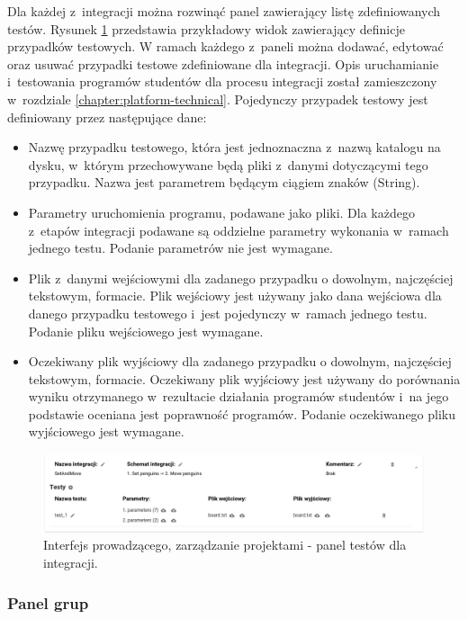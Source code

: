 Dla każdej z~integracji można rozwinąć panel zawierający listę zdefiniowanych testów.
Rysunek \ref{fig:lecturer_integrations_tests} przedstawia przykładowy widok zawierający definicje przypadków testowych.
W ramach każdego z~paneli można dodawać, edytować oraz usuwać przypadki testowe zdefiniowane dla integracji.
Opis uruchamianie i~testowania programów studentów dla procesu integracji został zamieszczony w~rozdziale \ref{chapter:platform-technical}.
Pojedynczy przypadek testowy jest definiowany przez następujące dane:
\begin {itemize}
    \item Nazwę przypadku testowego, która jest jednoznaczna z~nazwą katalogu na dysku, w~którym przechowywane będą pliki z~danymi dotyczącymi tego przypadku.
    Nazwa jest parametrem będącym ciągiem znaków (String).
    \item Parametry uruchomienia programu, podawane jako pliki.
    Dla każdego z~etapów integracji podawane są oddzielne parametry wykonania w~ramach jednego testu.
    Podanie parametrów nie jest wymagane.
    \item Plik z~danymi wejściowymi dla zadanego przypadku o dowolnym, najczęściej tekstowym, formacie.
    Plik wejściowy jest używany jako dana wejściowa dla danego przypadku testowego i~jest pojedynczy w~ramach jednego testu.
    Podanie pliku wejściowego jest wymagane.
    \item Oczekiwany plik wyjściowy dla zadanego przypadku o dowolnym, najczęściej tekstowym, formacie.
    Oczekiwany plik wyjściowy jest używany do porównania wyniku otrzymanego w~rezultacie działania programów studentów i~na jego podstawie oceniana jest poprawność programów.
    Podanie oczekiwanego pliku wyjściowego jest wymagane.
\end {itemize}

\begin{figure}[h]
    \centering
    \includegraphics[width = 16cm]{chapter04/lecturer_integrations_tests.png}
    \caption{Interfejs prowadzącego, zarządzanie projektami - panel testów dla integracji.}
    \label{fig:lecturer_integrations_tests}
\end{figure}

\subsubsection{Panel grup}

